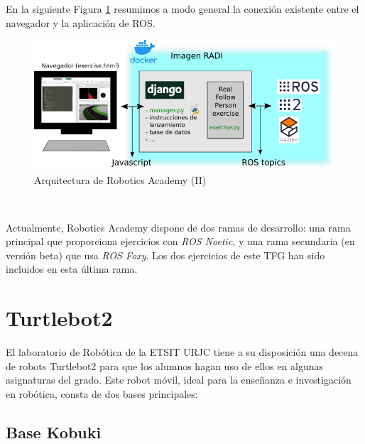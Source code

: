 En la siguiente Figura \ref{fig:infraestructura_robotics_academy} resumimos a modo general la conexión existente entre el navegador y la aplicación de ROS.

\begin{figure} [H]
  \begin{center}
    \includegraphics[width=15cm]{imagenes/cap3/esquema-robotics-academy.png}
  \end{center}
  \caption{Arquitectura de Robotics Academy (II)}
  \label{fig:infraestructura_robotics_academy}
\end{figure}\

Actualmente, Robotics Academy dispone de dos ramas de desarrollo: una rama principal que proporciona ejercicios con \textit{ROS Noetic}, y una rama secundaria (en versión beta) que usa \textit{ROS Foxy}. Los dos ejercicios de este TFG han sido incluidos en esta última rama. 


\section{Turtlebot2}
\label{sec:turtlebot2}

El laboratorio de Robótica de la ETSIT URJC tiene a su disposición una decena de robots Turtlebot2 para que los alumnos hagan uso de ellos en algunas asignaturas del grado. Este robot móvil, ideal para la enseñanza e investigación en robótica, consta de dos bases principales:\\

\subsection{Base Kobuki}
\label{subsec:turtlebot_base_kobuki}

